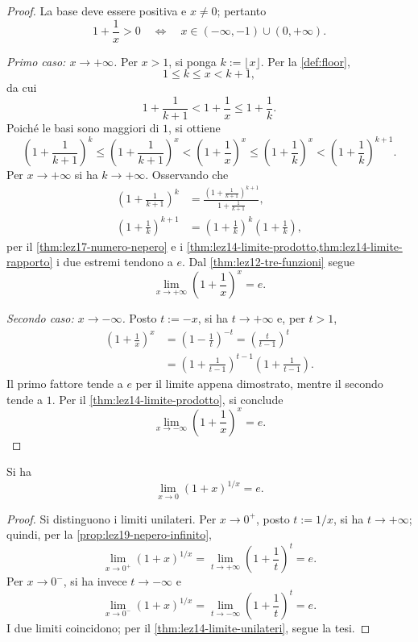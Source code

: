 \begin{proof}
La base deve essere positiva e \(x\ne0\); pertanto
\[
  1+\frac1x>0
  \quad\Longleftrightarrow\quad
  x\in(-\infty,-1)\cup(0,+\infty).
\]

\emph{Primo caso: \(x\to+\infty\).}
Per \(x>1\), si ponga \(k:=\lfloor x\rfloor\).
Per la \cref{def:floor},
\[
  1\le k\le x<k+1,
\]
da cui
\[
  1+\frac1{k+1}<1+\frac1x\le1+\frac1k.
\]
Poiché le basi sono maggiori di \(1\), si ottiene
\[
  \left(1+\frac1{k+1}\right)^k
  \le\left(1+\frac1{k+1}\right)^x
  <\left(1+\frac1x\right)^x
  \le\left(1+\frac1k\right)^x
  <\left(1+\frac1k\right)^{k+1}.
\]
Per \(x\to+\infty\) si ha \(k\to+\infty\).
Osservando che
\[
\begin{aligned}
  \left(1+\frac1{k+1}\right)^k
    &=\frac{\left(1+\frac1{k+1}\right)^{k+1}}
            {1+\frac1{k+1}},\\[4pt]
  \left(1+\frac1k\right)^{k+1}
    &=\left(1+\frac1k\right)^k
      \left(1+\frac1k\right),
\end{aligned}
\]
per il \cref{thm:lez17-numero-nepero} e i
\cref{thm:lez14-limite-prodotto,thm:lez14-limite-rapporto}
i due estremi tendono a \(e\).
Dal \cref{thm:lez12-tre-funzioni} segue
\[
  \lim_{x\to+\infty}\left(1+\frac1x\right)^x=e.
\]

\emph{Secondo caso: \(x\to-\infty\).}
Posto \(t:=-x\), si ha \(t\to+\infty\) e, per \(t>1\),
\[
\begin{aligned}
  \left(1+\frac1x\right)^x
  &=\left(1-\frac1t\right)^{-t}
   =\left(\frac{t}{t-1}\right)^t\\
  &=\left(1+\frac1{t-1}\right)^{t-1}
    \left(1+\frac1{t-1}\right).
\end{aligned}
\]
Il primo fattore tende a \(e\) per il limite
appena dimostrato, mentre il secondo tende a \(1\).
Per il \cref{thm:lez14-limite-prodotto},
si conclude
\[
  \lim_{x\to-\infty}\left(1+\frac1x\right)^x=e.
\]
\end{proof}

\begin{proposition}
\label{prop:lez19-nepero-zero}
Si ha
\[
  \lim_{x\to0}(1+x)^{1/x}=e.
\]
\end{proposition}

\begin{proof}
Si distinguono i limiti unilateri.
Per \(x\to0^+\), posto \(t:=1/x\), si ha
\(t\to+\infty\); quindi, per la
\cref{prop:lez19-nepero-infinito},
\[
  \lim_{x\to0^+}(1+x)^{1/x}
  =\lim_{t\to+\infty}\left(1+\frac1t\right)^t=e.
\]
Per \(x\to0^-\), si ha invece \(t\to-\infty\) e
\[
  \lim_{x\to0^-}(1+x)^{1/x}
  =\lim_{t\to-\infty}\left(1+\frac1t\right)^t=e.
\]
I due limiti coincidono; per il
\cref{thm:lez14-limite-unilateri}, segue la tesi.
\end{proof}

